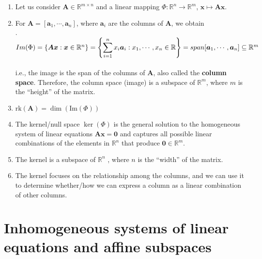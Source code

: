 \begin{enumerate}
    \item Let us consider $\bm{A} \in \mathbb{R}^{m\times n}$ and a linear mapping $\Phi : \mathbb{R}^n \to \mathbb{R}^m$, $\bm{x} \mapsto \bm{Ax}$.
    \hfill \cite{mfml/book/mml/Deisenroth-Faisal-Ong}

    \item For $\bm{A} = [\bm{a}_1, \cdots , \bm{a}_n]$, where $\bm{a}_i$ are the columns of $\bm{A}$, we obtain
    \hfill \cite{mfml/book/mml/Deisenroth-Faisal-Ong}
    \\
    .\hfill
    $
        Im(\Phi) 
        = \left\{\bm{Ax} : \bm{x} \in \mathbb{R}^ n \right\} 
        = \left\{\displaystyle\sum ^n _{i=1} x_i \bm{a}_i : x_1, \cdots , x_n \in \mathbb{R}\right\}
        = span[\bm{a}_1, \cdots , \bm{a}_n] \subseteq \mathbb{R}^m
    $
    \hfill \cite{mfml/book/mml/Deisenroth-Faisal-Ong}
    \\
    i.e., the image is the span of the columns of $\bm{A}$, also called the \textbf{column space}. 
    Therefore, the column space (image) is a subspace of $\mathbb{R}^m$, where $m$ is the “height” of the matrix.
    \hfill \cite{mfml/book/mml/Deisenroth-Faisal-Ong}

    \item $\text{rk}(\bm{A}) = \dim(\text{Im}(\Phi))$
    \hfill \cite{mfml/book/mml/Deisenroth-Faisal-Ong}

    \item The kernel/null space $\ker(\Phi)$ is the general solution to the homogeneous system of linear equations $\bm{Ax} = \bm{0}$ and captures all possible linear combinations of the elements in $\mathbb{R}^n$ that produce $\bm{0} \in \mathbb{R}^m$.
    \hfill \cite{mfml/book/mml/Deisenroth-Faisal-Ong}

    \item The kernel is a subspace of $\mathbb{R}^n$ , where $n$ is the “width” of the matrix.
    \hfill \cite{mfml/book/mml/Deisenroth-Faisal-Ong}

    \item The kernel focuses on the relationship among the columns, and we can use it to determine whether/how we can express a column as a linear combination of other columns.
    \hfill \cite{mfml/book/mml/Deisenroth-Faisal-Ong}
\end{enumerate}






\section{Inhomogeneous systems of linear equations and affine subspaces}

